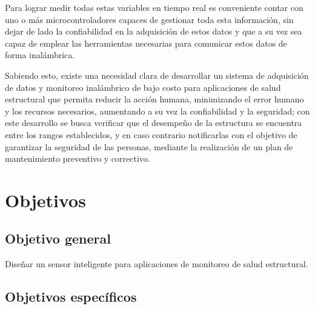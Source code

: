 Para lograr medir todas estas variables en tiempo real es conveniente contar con uno o más microcontroladores capaces de gestionar toda esta información, sin dejar de lado la confiabilidad en la adquisición de estos datos y que a su vez sea capaz de emplear las herramientas necesarias para comunicar estos datos de forma inalámbrica.

Sabiendo esto, existe una necesidad clara de desarrollar un sistema de adquisición de datos y monitoreo inalámbrico de bajo costo para aplicaciones de salud estructural que permita reducir la acción humana, minimizando el error humano y los recursos necesarios, aumentando a su vez la confiabilidad y la seguridad; con este desarrollo se busca verificar que el desempeño de la estructura se encuentra entre los rangos establecidos, y en caso contrario notificarlas con el objetivo de garantizar la seguridad de las personas, mediante la realización de un plan de mantenimiento preventivo y correctivo.


\section{Objetivos}

\subsection{Objetivo general}

Diseñar un sensor inteligente para aplicaciones de monitoreo de salud estructural.

\subsection{Objetivos específicos}

